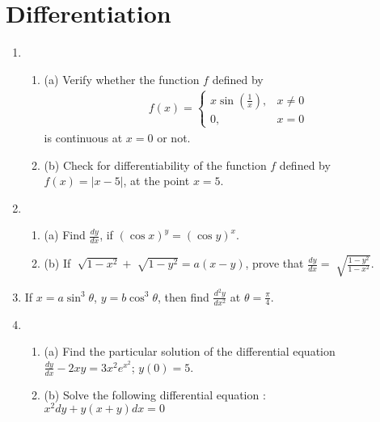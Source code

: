 \documentclass[12pt,-letter paper]{article}
\begin{document}
\section {Differentiation}
\begin {enumerate}
\item \begin {enumerate}                                                                                   \item[(a)] Verify whether the function $f$ defined by                                                              \begin{align*}
                f(x) = \begin{cases} x\sin\left(\frac{1}{x}\right), & x\neq 0 \\ 0, & x = 0 \end{cases}            \end{align*}
        is continuous at $x=0$ or not.                                                                                     \item [(b)] Check for differentiability of the function $f$ defined by $f(x) = |x-5|$, at the point $x=5$.
      \end {enumerate}
\item \begin {enumerate}                                                                                                   \item [(a)] Find $\frac{dy}{dx}$, if $(\cos x)^y = (\cos y)^x$.
                \item [(b)] If $\sqrt[]{1-x^2} + \sqrt[]{1-y^2} = a(x - y)$, prove that $\frac{dy}{dx} = \sqrt[]{\frac{1-y^2}{1-x^2}}$.
        \end {enumerate}
                                                                                                           
\item If $x = a \sin^3\theta$, $y = b\cos^3\theta$, then find $\frac{d^2y}{dx^2}$ at $\theta = \frac{\pi}{4}$.                                                                                                        \item \begin {enumerate}
\item [(a)] Find the particular solution of the differential equation\\ $\frac{dy}{dx} - 2xy = 3x^2 e^{x^2}$; $y(0) = 5$.
\item [(b)] Solve the following differential equation :\\ $x^2 dy + y(x+y) dx =0$
        \end {enumerate}
\end {enumerate}
\end{document}
